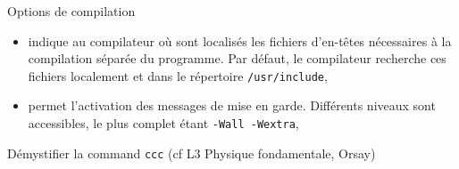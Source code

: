 \documentclass[c]{beamer}
\begin{document}
\begin{frame}[fragile,label={sec:orgheadline5}]{Options de compilation}
 \begin{itemize}
\item {} indique au compilateur où sont localisés les fichiers
d'en-têtes nécessaires à la compilation séparée du programme. Par défaut, le
compilateur recherche ces fichiers localement et dans le répertoire
\texttt{/usr/include},
\end{itemize}

\pause

\begin{itemize}
\item {} permet l'activation des messages de mise en garde. Différents
niveaux sont accessibles, le plus complet étant \texttt{-Wall -Wextra},
\end{itemize}


\end{frame}


\begin{frame}[fragile]{Démystifier la command \texttt{ccc} (\footnotesize{cf L3 Physique fondamentale, Orsay})}
 \centering
\begin{animateinline}[step,poster=last]{1}
  \clearbuf{}
  \newframe
  \newframe
  \newframe
\end{animateinline}
\end{frame}
\end{document}

